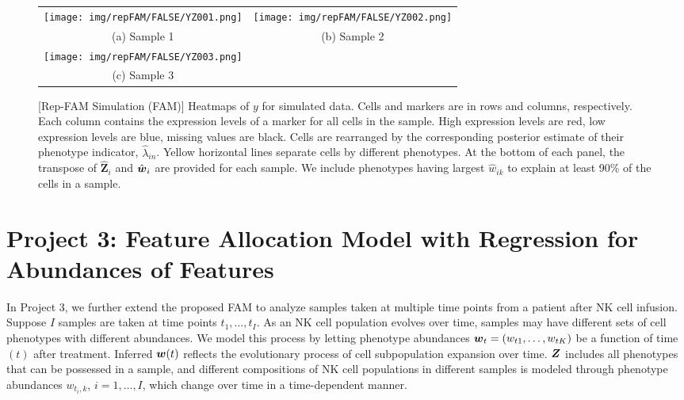\documentclass[12pt,]{article}
\def\Z{\bm{Z}}
\newcommand{\bZ}{\mbox{\boldmath $Z$}}
\newcommand{\bw}{\mbox{\boldmath $w$}}
\begin{document}
\begin{figure}[H]
  \begin{center}
  \begin{tabular}{cc}
  \texttt{[image: img/repFAM/FALSE/YZ001.png]}&
  \texttt{[image: img/repFAM/FALSE/YZ002.png]}\\
  {\small (a) Sample 1} & {\small(b) Sample 2} \\
  \texttt{[image: img/repFAM/FALSE/YZ003.png]}&\\
  {\small (c) Sample 3} & \\
  \end{tabular}
  \end{center}
  \vspace{-0.05in}
  \caption{\small[Rep-FAM Simulation (FAM)]  Heatmaps of $y$ for simulated data.
    Cells and markers are in rows and columns, respectively. Each column
    contains the expression levels of a marker for all cells in the sample.
    High expression levels are red, low expression levels are blue, missing
    values are black.  Cells are rearranged by the corresponding posterior
    estimate of their phenotype indicator, $\hat{\lambda}_{in}$.  Yellow
    horizontal lines separate cells by different phenotypes.  At the bottom of
    each panel, the transpose of $\hat{\Z}_i$ and $\hat{\bw}_i$ are provided
    for each sample.  We include phenotypes having largest $\hat{w}_{ik}$ to
    explain at least 90\% of the cells in a sample.}
\label{fig:repFAM-FALSE-post-Z}
\end{figure}

\section{Project 3: Feature Allocation Model with Regression for Abundances of
Features}\label{sec:proj3}
In Project 3, we further extend the proposed FAM to analyze samples taken at
multiple time points from a patient after NK cell infusion. Suppose $I$ samples
are taken at time points $t_1, \ldots, t_I$.   As an NK cell population evolves
over time, samples may have different sets of cell phenotypes with different
abundances. We model this process by letting phenotype abundances
$\bw_{t}=(w_{t1}, \ldots, w_{tK})$ be a function of time $(t)$ after treatment.
Inferred $\bw(t)$ reflects the evolutionary process of cell subpopulation
expansion over time.   $\bZ$ includes all phenotypes that can be possessed in a
sample, and different compositions of NK cell populations in different samples is
modeled through phenotype abundances $w_{t_i, k}$, $i=1, \ldots, I$, which
change over time in a time-dependent manner.
\end{document}
